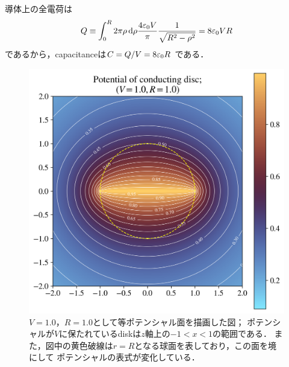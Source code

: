   導体上の全電荷は
  \begin{gather}%
    Q \equiv \int_0^R 2\pi \rho \dl{\rho} 
    \frac{4\eps_0 V}{\pi} \frac{1}{\sqrt{R^2  -\rho^2}} = 8\eps_0 VR
  \end{gather}%
  であるから，capacitanceは$C = Q/V = 8\varepsilon_0 R$
  である．
  \begin{figure}[htbp]%
    \centering%
    \includegraphics[width=0.5\linewidth]{py/3-3_normal_w_circle.png}%
    \caption{$V=1.0$，$R = 1.0$として等ポテンシャル面を描画した図；
    ポテンシャルが$V$に保たれているdiskは$z$軸上の$-1 < x <1$の範囲である．
    また，図中の黄色破線は$r = R$となる球面を表しており，この面を境にして
    ポテンシャルの表式が変化している．}%
    \label{fig:3-3_normal_w_circle}%
  \end{figure}%

  \clearpage
